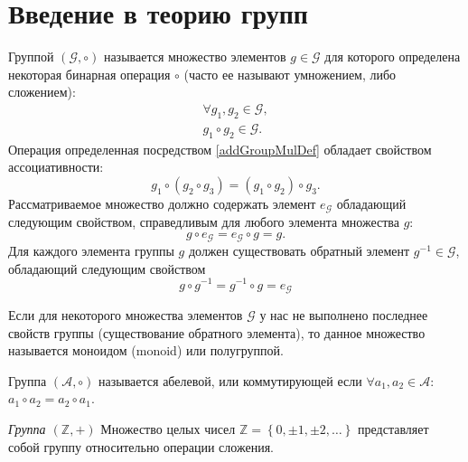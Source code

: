 \section{Введение в теорию групп}
\label{sec:add:group}
\begin{definition}
\label{def:add:group}
Группой $(\mathcal{G}, \circ)$ называется множество элементов $g \in
\mathcal{G}$ для которого определена 
некоторая бинарная операция $\circ$ (часто ее называют умножением, либо сложением):
\begin{eqnarray}
\forall g_1,g_2 \in \mathcal{G},
\nonumber \\
g_1 \circ g_2 \in \mathcal{G}.
\label{addGroupMulDef}
\end{eqnarray}
Операция определенная посредством \eqref{addGroupMulDef} обладает свойством
ассоциативности:
\begin{equation}
g_1 \circ \left( g_2 \circ g_3 \right ) = 
\left( g_1 \circ  g_2 \right ) \circ g_3.
\nonumber
\end{equation}
Рассматриваемое множество должно содержать элемент $e_{\mathcal{G}}$ обладающий
следующим свойством, справедливым для любого элемента множества $g$:
\begin{equation}
g \circ e_{\mathcal{G}} = e_{\mathcal{G}} \circ g = g.
\nonumber
\end{equation}
Для каждого элемента группы $g$ должен существовать обратный
элемент $g^{-1} \in \mathcal{G}$, обладающий следующим свойством
\begin{equation}
g \circ g^{-1} = g^{-1} \circ g = e_{\mathcal{G}}
\nonumber
\end{equation} 
\end{definition}

\begin{definition}[Моноид]
\label{def:add:monoid}
Если для некоторого множества элементов $\mathcal{G}$ у нас не
выполнено последнее свойств группы (существование обратного элемента),
то данное множество называется моноидом (monoid) или полугруппой.
\end{definition}

\begin{definition}
\label{def:add:abeliangroup}
Группа $(\mathcal{A}, \circ)$ называется абелевой, или коммутирующей
если $\forall a_1,a_2 \in \mathcal{A}$: $a_1 \circ a_2 = a_2 \circ a_1$.
\end{definition}

\begin{example}
\emph{Группа $\left(\mathbb{Z}, +\right)$}
Множество целых чисел $\mathbb{Z} = \left\{0, \pm1, \pm2,
\dots\right\}$ представляет собой группу относительно операции сложения.
\nonumber
\end{example}

